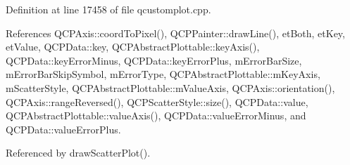 Definition at line 17458 of file qcustomplot.\+cpp.



References Q\+C\+P\+Axis\+::coord\+To\+Pixel(), Q\+C\+P\+Painter\+::draw\+Line(), et\+Both, et\+Key, et\+Value, Q\+C\+P\+Data\+::key, Q\+C\+P\+Abstract\+Plottable\+::key\+Axis(), Q\+C\+P\+Data\+::key\+Error\+Minus, Q\+C\+P\+Data\+::key\+Error\+Plus, m\+Error\+Bar\+Size, m\+Error\+Bar\+Skip\+Symbol, m\+Error\+Type, Q\+C\+P\+Abstract\+Plottable\+::m\+Key\+Axis, m\+Scatter\+Style, Q\+C\+P\+Abstract\+Plottable\+::m\+Value\+Axis, Q\+C\+P\+Axis\+::orientation(), Q\+C\+P\+Axis\+::range\+Reversed(), Q\+C\+P\+Scatter\+Style\+::size(), Q\+C\+P\+Data\+::value, Q\+C\+P\+Abstract\+Plottable\+::value\+Axis(), Q\+C\+P\+Data\+::value\+Error\+Minus, and Q\+C\+P\+Data\+::value\+Error\+Plus.



Referenced by draw\+Scatter\+Plot().


